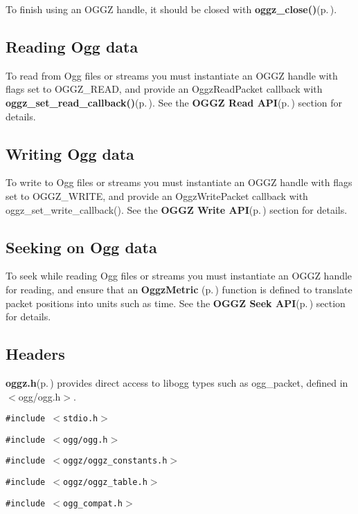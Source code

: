 To finish using an OGGZ handle, it should be closed with {\bf oggz\_\-close()}{\rm (p.\,\pageref{oggz_8h_a8})}.\subsection{Reading Ogg data}\label{reading}
To read from Ogg files or streams you must instantiate an OGGZ handle with flags set to OGGZ\_\-READ, and provide an Oggz\-Read\-Packet callback with {\bf oggz\_\-set\_\-read\_\-callback()}{\rm (p.\,\pageref{group__read__api_a1})}. See the {\bf OGGZ Read API}{\rm (p.\,\pageref{group__read__api})} section for details.\subsection{Writing Ogg data}\label{writing}
To write to Ogg files or streams you must instantiate an OGGZ handle with flags set to OGGZ\_\-WRITE, and provide an Oggz\-Write\-Packet callback with oggz\_\-set\_\-write\_\-callback(). See the {\bf OGGZ Write API}{\rm (p.\,\pageref{group__write__api})} section for details.\subsection{Seeking on Ogg data}\label{seeking}
To seek while reading Ogg files or streams you must instantiate an OGGZ handle for reading, and ensure that an {\bf Oggz\-Metric }{\rm (p.\,\pageref{group__metric})} function is defined to translate packet positions into units such as time. See the {\bf OGGZ Seek API}{\rm (p.\,\pageref{group__seek__api})} section for details.\subsection{Headers}\label{headers}
{\bf oggz.h}{\rm (p.\,\pageref{oggz_8h})} provides direct access to libogg types such as ogg\_\-packet, defined in $<$ogg/ogg.h$>$.

{\tt \#include $<$stdio.h$>$}\par
{\tt \#include $<$ogg/ogg.h$>$}\par
{\tt \#include $<$oggz/oggz\_\-constants.h$>$}\par
{\tt \#include $<$oggz/oggz\_\-table.h$>$}\par
{\tt \#include $<$ogg\_\-compat.h$>$}\par
